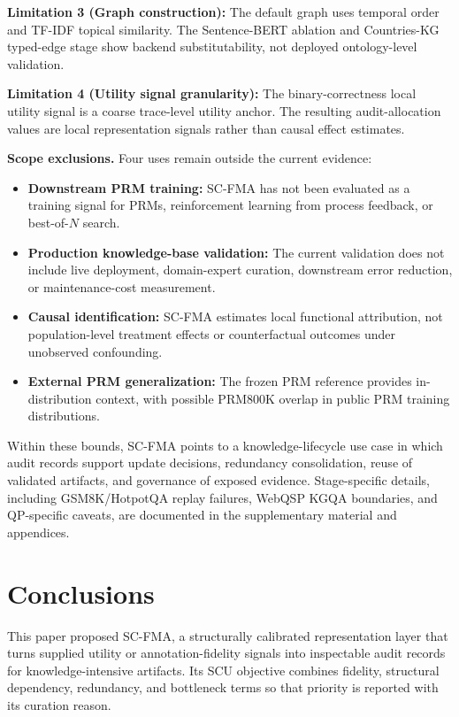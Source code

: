 \documentclass[a4paper,fleqn]{cas-sc}
\begin{document}
\textbf{Limitation 3 (Graph construction):} The default graph uses temporal order and TF-IDF topical similarity. The Sentence-BERT ablation and Countries-KG typed-edge stage show backend substitutability, not deployed ontology-level validation.

\textbf{Limitation 4 (Utility signal granularity):} The binary-correctness local utility signal is a coarse trace-level utility anchor. The resulting audit-allocation values are local representation signals rather than causal effect estimates.

\medskip
\noindent\textbf{Scope exclusions.} Four uses remain outside the current evidence:
\begin{itemize}
  \item \textbf{Downstream PRM training:} SC-FMA has not been evaluated as a training signal for PRMs, reinforcement learning from process feedback, or best-of-$N$ search.
  \item \textbf{Production knowledge-base validation:} The current validation does not include live deployment, domain-expert curation, downstream error reduction, or maintenance-cost measurement.
  \item \textbf{Causal identification:} SC-FMA estimates local functional attribution, not population-level treatment effects or counterfactual outcomes under unobserved confounding.
  \item \textbf{External PRM generalization:} The frozen PRM reference provides in-distribution context, with possible PRM800K overlap in public PRM training distributions.
\end{itemize}

\noindent Within these bounds, SC-FMA points to a knowledge-lifecycle use case in which audit records support update decisions, redundancy consolidation, reuse of validated artifacts, and governance of exposed evidence. Stage-specific details, including GSM8K/HotpotQA replay failures, WebQSP KGQA boundaries, and QP-specific caveats, are documented in the supplementary material and appendices.

\section{Conclusions}
\label{sec:conclusions}

This paper proposed SC-FMA, a structurally calibrated representation layer that turns supplied utility or annotation-fidelity signals into inspectable audit records for knowledge-intensive artifacts. Its SCU objective combines fidelity, structural dependency, redundancy, and bottleneck terms so that priority is reported with its curation reason.
\end{document}
